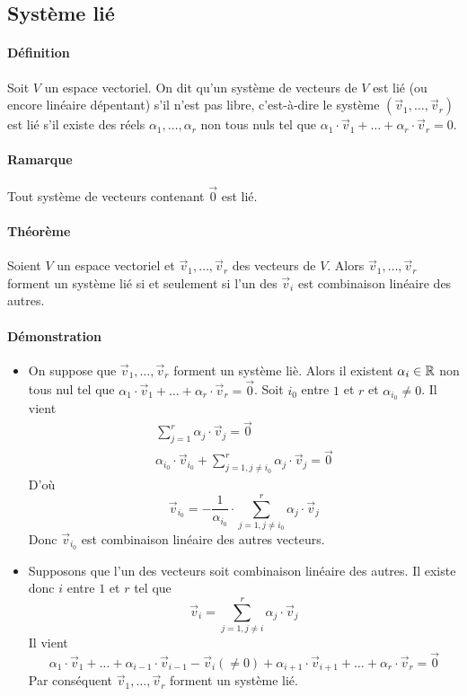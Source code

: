 %
\subsection{Système lié}
%
\paragraph{Définition} Soit $V$ un espace vectoriel. On dit qu'un système de vecteurs de $V$ est lié (ou encore linéaire dépentant) s'il n'est pas libre, c'est-à-dire le système $(\vec{v}_1, \ldots, \vec{v}_r)$ est lié s'il existe des réels $\alpha_1, \ldots, \alpha_r$ non tous nuls tel que $\alpha_1 \cdot \vec{v}_1 + \ldots + \alpha_r \cdot \vec{v}_r = 0$.
\paragraph{Ramarque} Tout système de vecteurs contenant $\vec{0}$ est lié.

\paragraph{Théorème} Soient $V$ un espace vectoriel et $\vec{v}_1, \ldots, \vec{v}_r$ des vecteurs de $V$. Alors $\vec{v}_1, \ldots, \vec{v}_r$ forment un système lié si et seulement si l'un des $\vec{v}_i$ est combinaison linéaire des autres.
\paragraph{Démonstration} 
\begin{itemize}
  \item On suppose que $\vec{v}_1, \ldots, \vec{v}_r$ forment un système liè. Alors il existent $\alpha_i \in \mathbb{R}$ non tous nul tel que $\alpha_1 \cdot \vec{v}_1 + \ldots + \alpha_r \cdot \vec{v}_r = \vec{0}$. Soit $i_0$ entre $1$ et $r$ et $\alpha_{i_0} \neq 0$. Il vient
    \begin{eqnarray*}
      \sum_{j=1}^{r} \alpha_j \cdot \vec{v}_j = \vec{0} \\
      \alpha_{i_0} \cdot \vec{v}_{i_0} + \sum_{j=1, j \neq i_0}^{r} \alpha_j \cdot \vec{v}_j = \vec{0}
    \end{eqnarray*}
    D'où
    $$\vec{v}_{i_0} = -\frac{1}{\alpha_{i_0}} \cdot \sum_{j=1, j \neq i_0}^{r} \alpha_j \cdot \vec{v}_j$$
    Donc $\vec{v}_{i_0}$ est combinaison linéaire des autres vecteurs.
  
  \item Supposons que l'un des vecteurs soit combinaison linéaire des autres. Il existe donc $i$ entre $1$ et $r$ tel que 
    $$\vec{v}_i = \sum_{j=1, j \neq i}^{r} \alpha_j \cdot \vec{v}_j$$
    Il vient 
    $$\alpha_1 \cdot \vec{v}_1 + \ldots + \alpha_{i-1} \cdot \vec{v}_{i-1} - \vec{v}_i (\neq 0) + \alpha_{i+1} \cdot \vec{v}_{i+1} + \ldots + \alpha_r \cdot \vec{v}_r = \vec{0}$$
    Par conséquent $\vec{v}_1, \ldots, \vec{v}_r$ forment un système lié.
\end{itemize}

